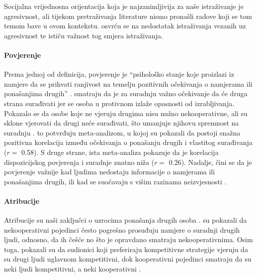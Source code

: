 \documentclass[a4paper, 12pt]{report}
\begin{document}
Socijalna vrijednosna orijentacija koja je najzanimljivija za naše istraživanje
je agresivnost, ali tijekom pretraživanja literature nismo pronašli radove koji
se tom temom bave u ovom kontekstu. 
 osvrću se na nedostatak istraživanja vezanih uz
agresivnost te ističu važnost tog smjera istraživanja.

\paragraph{Povjerenje} Prema jednoj od definicija, povjerenje je
\enquote{psihološko stanje koje proizlazi iz namjere da se prihvati ranjivost
    na temelju pozitivnih očekivanja o namjerama ili ponašanjima drugih}
\citep*[str. 395]{rousseau1998not}.
\citet{20yexg} smatraju da je za suradnju važno očekivanje da će druga
strana surađivati jer se osoba u protivnom izlaže opasnosti od izrabljivanja.
Pokazalo se da osobe koje ne vjeruju drugima nisu nužno nekooperativne, ali
su sklone vjerovati da drugi neće surađivati, što umanjuje njihovu spremnost na
suradnju \citep{vancoop}. \citet{balliet2013trust}
to potvrđuju meta-analizom, u kojoj su pokazali da postoji snažna pozitivna korelacija između očekivanja o
ponašanju drugih i vlastitog surađivanja ($r =$ 0.58). S druge strane, ista
meta-analiza pokazuje da je korelacija
dispozicijskog povjerenja i suradnje znatno  niža ($r =$ 0.26). Nadalje, čini se da je povjerenje važnije kad ljudima
nedostaju informacije o namjerama ili ponašanjima drugih, ili kad se suočavaju s
višim razinama neizvjesnosti \citep{vancoop}.  

\paragraph{Atribucije} Atribucije su naši zaključci o uzrocima ponašanja drugih
osoba \citep{aronson}. \citet{kelley1970inference} su pokazali da
nekooperativni pojedinci često pogrešno prosuđuju namjere o suradnji
drugih ljudi, odnosno, da ih češće no što je opravdano smatraju nekooperativnima. Osim
toga, pokazali su da sudionici koji preferiraju kompetitivne strategije vjeruju
da su drugi ljudi uglavnom kompetitivni, dok kooperativni pojedinci smatraju
da su neki ljudi kompetitivni, a neki kooperativni \citep{kelley1970social}.
\end{document}
